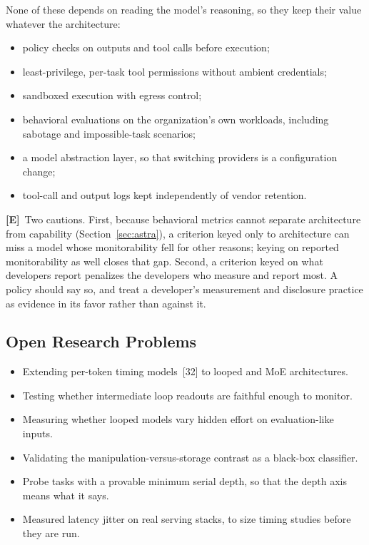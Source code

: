 \documentclass[11pt,letterpaper]{article}
\newcommand{\mE}{\textcolor{deepindigo}{\textbf{[E]}}}
\begin{document}
\begin{keybox}
None of these depends on reading the model's reasoning, so they keep their value whatever the architecture:
\begin{itemize}
  \item policy checks on outputs and tool calls before execution;
  \item least-privilege, per-task tool permissions without ambient credentials;
  \item sandboxed execution with egress control;
  \item behavioral evaluations on the organization's own workloads, including sabotage and impossible-task scenarios;
  \item a model abstraction layer, so that switching providers is a configuration change;
  \item tool-call and output logs kept independently of vendor retention.
\end{itemize}
\end{keybox}

\mE\ Two cautions. First, because behavioral metrics cannot separate architecture from capability (Section~\ref{sec:astra}), a criterion keyed only to architecture can miss a model whose monitorability fell for other reasons; keying on reported monitorability as well closes that gap. Second, a criterion keyed on what developers report penalizes the developers who measure and report most. A policy should say so, and treat a developer's measurement and disclosure practice as evidence in its favor rather than against it.

\subsection{Open Research Problems}
\begin{itemize}
  \item Extending per-token timing models~[32] to looped and MoE architectures.
  \item Testing whether intermediate loop readouts are faithful enough to monitor.
  \item Measuring whether looped models vary hidden effort on evaluation-like inputs.
  \item Validating the manipulation-versus-storage contrast as a black-box classifier.
  \item Probe tasks with a provable minimum serial depth, so that the depth axis means what it says.
  \item Measured latency jitter on real serving stacks, to size timing studies before they are run.
\end{itemize}
\end{document}
